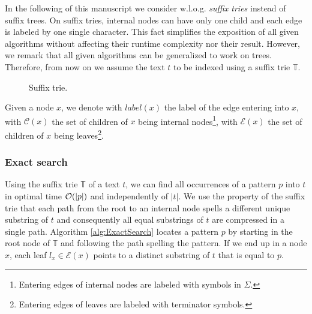 In the following of this manuscript we consider w.l.o.g. \emph{suffix tries} instead of suffix trees.
On suffix tries, internal nodes can have only one child and each edge is labeled by one single character.
This fact simplifies the exposition of all given algorithms without affecting their runtime complexity nor their result.
However, we remark that all given algorithms can be generalized to work on trees.
Therefore, from now on we assume the text $t$ to be indexed using a suffix trie $\mathbb{T}$.

\begin{figure}[h]
\caption{Suffix trie.}
\label{fig:strie}
\end{figure}

Given a node $x$, we denote with $label(x)$ the label of the edge entering into $x$, with $\mathcal{C}(x)$ the set of children of $x$ being internal nodes\footnote{Entering edges of internal nodes are labeled with symbols in $\Sigma$.}, with $\mathcal{E}(x)$ the set of children of $x$ being leaves\footnote{Entering edges of leaves are labeled with terminator symbols.}.

\subsubsection{Exact search}


Using the suffix trie $\mathbb{T}$ of a text $t$, we can find all occurrences of a pattern $p$ into $t$ in optimal time $\mathcal{O}(|p|)$ and independently of $|t|$.
We use the property of the suffix trie that each path from the root to an internal node spells a different unique substring of $t$ and consequently all equal substrings of $t$ are compressed in a single path.
Algorithm \ref{alg:ExactSearch} locates a pattern $p$ by starting in the root node of $\mathbb{T}$ and following the path spelling the pattern.
If we end up in a node $x$, each leaf $l_x \in \mathcal{E}(x)$ points to a distinct substring of $t$ that is equal to $p$.


